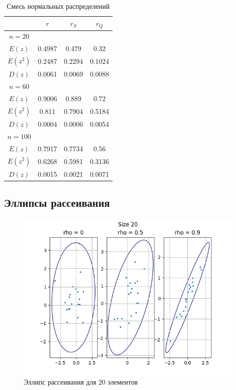 \documentclass[a4paper,14pt]{article}
\begin{document}
	\begin{table}[H]
		\centering
		\begin{tabular}{|c|c|c|c|}
			\hline
			& $r$ & $r_S$ & $r_Q$\\\hline
			$n=20$ & & &\\\hline
			$E(z)$ & 0.4987 & 0.479 & 0.32\\\hline
			$E(z^2)$ & 0.2487 & 0.2294 & 0.1024\\\hline
			$D(z)$ & 0.0061 & 0.0069 & 0.0088\\\hline
			\hline
			$n=60$ & & &\\\hline
			$E(z)$ & 0.9006 & 0.889 & 0.72\\\hline
			$E(z^2)$ & 0.811 & 0.7904 & 0.5184\\\hline
			$D(z)$ & 0.0004 & 0.0006 & 0.0054\\\hline
			\hline
			$n=100$ & & &\\\hline
			$E(z)$ & 0.7917 & 0.7734 & 0.56\\\hline
			$E(z^2)$ & 0.6268 & 0.5981 & 0.3136\\\hline
			$D(z)$ & 0.0015 & 0.0021 & 0.0071\\\hline
		\end{tabular}
		\caption{Смесь нормальных распределений}
	\end{table}
	
	\subsection{Эллипсы рассеивания}
	\begin{figure}[H]
		\centering
		\includegraphics[scale=0.85]{../image/lab5_20.png}
		\caption{Эллипс рассеивания для 20 элементов}
	\end{figure}
	
\end{document}
